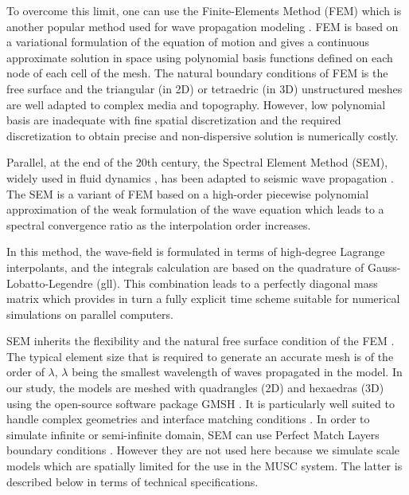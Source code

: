 \documentclass[manuscript,revised]{geophysics}
\begin{document}
\noindent To overcome this limit, one can use the Finite-Elements Method (FEM) which is another popular method used for wave propagation modeling \citep{Lysmer_FEM_1972,Seron_FEM_1990,Hulbert_FEM_1990}. FEM is based on a variational formulation of the equation of motion and gives a continuous approximate solution in space using polynomial basis functions defined on each node of each cell of the mesh. The natural boundary conditions of FEM is the free surface and the triangular (in 2D) or tetraedric (in 3D) unstructured meshes are well adapted to complex media and topography. However, low polynomial basis are inadequate with fine spatial discretization and the required discretization to obtain precise and non-dispersive solution is numerically costly. 

\noindent Parallel, at the end of the 20th century, the Spectral Element Method (SEM), widely used in fluid dynamics \citep{Patera_SEM_1984,Korczak_SEM_1986,Karniadakis_FEM_1989}, has been adapted to seismic wave propagation \citep{Komatitsch_SEM_1998,Komatitsch_ISM_1999,Komatitsch_SEM_2005,Festa_PML_2005}. The SEM is a variant of FEM based on a high-order piecewise polynomial approximation of the weak formulation of the wave equation which leads to a spectral convergence ratio as the interpolation order increases. 

\noindent In this method, the wave-field is formulated in terms of high-degree Lagrange interpolants, and the integrals calculation are based on the quadrature of Gauss-Lobatto-Legendre (gll). This combination leads to a perfectly diagonal mass matrix which provides in turn a fully explicit time scheme suitable for numerical simulations on parallel computers.

\noindent SEM inherits the flexibility and the natural free surface condition of the FEM \citep{Tromp_SEM_2008}. The typical element size that is required to generate an accurate mesh is of the order of $\lambda$, $\lambda$ being the smallest wavelength of waves propagated in the model. In our study, the models are meshed with quadrangles (2D) and hexaedras (3D) using the open-source software package GMSH \citep{Geuzaine_MSH_2009}. It is particularly well suited to handle complex geometries and interface matching conditions \citep{Cristini_SEM_2012}. In order to simulate infinite or semi-infinite domain, SEM can use Perfect Match Layers boundary conditions \citep{Berenger_PML_1994,Festa_PML_2005}. However they are not used here because we simulate scale models which are spatially limited for the use in the MUSC system. The latter is described below in terms of technical specifications.
\end{document}
